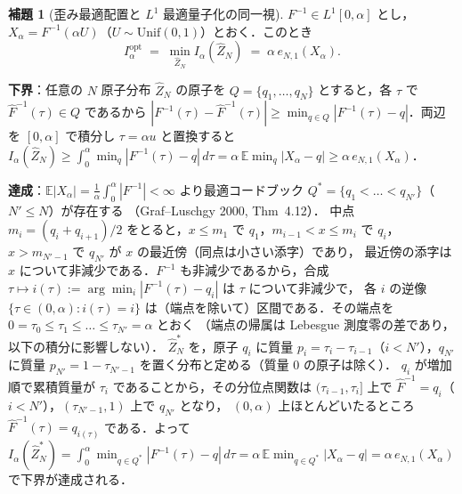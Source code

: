 \documentclass[a4paper,10pt]{jsarticle}
\makeatletter
\theoremstyle{definition}
\newtheorem{lemma}{補題}[section]
\renewenvironment{proof}[1][\proofname]{\par
  \pushQED{\qed}%
  \normalfont \topsep6\p@\@plus6\p@\relax
  \trivlist
  \item[\hskip\labelsep\textbf{#1}]\ignorespaces
}{%
  \popQED\endtrivlist\@endpefalse
}
\renewcommand{\proofname}{証明}
\newcommand{\Finv}{F^{-1}}
\newcommand{\Fhinv}{\hat{F}^{-1}}
\newcommand{\E}{\mathbb{E}}
\newcommand{\eN}{e_{N,1}}
\newcommand{\Iopt}{I_\alpha^{\mathrm{opt}}}
\makeatother
\begin{document}
\begin{lemma}[歪み最適配置と $L^1$ 最適量子化の同一視]
\label{lem:identify}
$\Finv\in L^1[0,\alpha]$ とし，$X_\alpha=\Finv(\alpha U)$（$U\sim\mathrm{Unif}(0,1)$）とおく．このとき
\begin{equation}
  \Iopt\;=\;\min_{\hat Z_N}I_\alpha(\hat Z_N)\;=\;\alpha\,\eN(X_\alpha).
  \label{eq:identify}
\end{equation}
\end{lemma}
\begin{proof}
\textbf{下界}：任意の $N$ 原子分布 $\hat Z_N$ の原子を $Q=\{q_1,\dots,q_N\}$ とすると，各 $\tau$ で $\Fhinv(\tau)\in Q$ であるから
$|\Finv(\tau)-\Fhinv(\tau)|\ge\min_{q\in Q}|\Finv(\tau)-q|$．両辺を $[0,\alpha]$ で積分し $\tau=\alpha u$ と置換すると
$I_\alpha(\hat Z_N)\ge\int_0^\alpha\min_{q}|\Finv(\tau)-q|\,d\tau=\alpha\,\E\min_q|X_\alpha-q|\ge\alpha\,\eN(X_\alpha)$．

\textbf{達成}：$\E|X_\alpha|=\frac1\alpha\int_0^\alpha|\Finv|<\infty$ より最適コードブック $Q^\ast=\{q_1<\dots<q_{N'}\}$（$N'\le N$）が存在する
（Graf--Luschgy 2000, Thm~4.12）．
中点 $m_i=(q_i+q_{i+1})/2$ をとると，$x\le m_1$ で $q_1$，$m_{i-1}<x\le m_i$ で $q_i$，$x>m_{N'-1}$ で $q_{N'}$ が $x$ の最近傍（同点は小さい添字）であり，
最近傍の添字は $x$ について非減少である．$\Finv$ も非減少であるから，合成 $\tau\mapsto i(\tau):=\arg\min_i|\Finv(\tau)-q_i|$ は $\tau$ について非減少で，
各 $i$ の逆像 $\{\tau\in(0,\alpha):i(\tau)=i\}$ は（端点を除いて）区間である．その端点を $0=\tau_0\le\tau_1\le\dots\le\tau_{N'}=\alpha$ とおく
（端点の帰属は Lebesgue 測度零の差であり，以下の積分に影響しない）．
$\hat Z_N^\ast$ を，原子 $q_i$ に質量 $p_i=\tau_i-\tau_{i-1}$（$i<N'$），$q_{N'}$ に質量 $p_{N'}=1-\tau_{N'-1}$ を置く分布と定める（質量 $0$ の原子は除く）．
$q_i$ が増加順で累積質量が $\tau_i$ であることから，その分位点関数は $(\tau_{i-1},\tau_i]$ 上で $\Fhinv=q_i$（$i<N'$），$(\tau_{N'-1},1)$ 上で $q_{N'}$ となり，
$(0,\alpha)$ 上ほとんどいたるところ $\Fhinv(\tau)=q_{i(\tau)}$ である．よって
$I_\alpha(\hat Z_N^\ast)=\int_0^\alpha\min_{q\in Q^\ast}|\Finv(\tau)-q|\,d\tau=\alpha\,\E\min_{q\in Q^\ast}|X_\alpha-q|=\alpha\,\eN(X_\alpha)$ で下界が達成される．
\end{proof}
\end{document}
